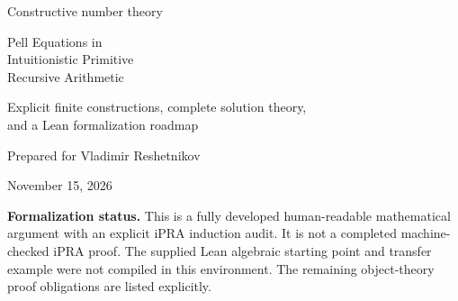 \documentclass[11pt,letterpaper]{article}
\theoremstyle{definition}
\newcommand{\isqrt}{\operatorname{isqrt}}
\begin{document}
\begin{titlepage}
\vspace*{1.1cm}
{\Large\color{blue!45!black} Constructive number theory\par}
\vspace{0.5cm}
{\huge\bfseries\raggedright Pell Equations in\\
Intuitionistic Primitive\\
Recursive Arithmetic\par}
\vspace{0.7cm}
{\Large\raggedright Explicit finite constructions, complete solution theory,\\
and a Lean formalization roadmap\par}
\vspace{1cm}
{\large Prepared for Vladimir Reshetnikov\par}
{\large November 15, 2026\par}
\vfill
\begin{abstract}
We develop the ordinary and generalized Pell equations using only intuitionistic
logic, primitive recursive functions, and quantifier-free induction. For every
nonsquare integer $D\ge2$, we construct its fundamental positive solution,
classify all solutions, decide the negative equation and every equation
$x^2-Dy^2=N$, and prove divisibility, congruence, and approximation theorems.
The existence argument is given twice: first by two explicitly finite
pigeonhole arguments, then by a reduced continued-fraction algorithm with at
most $4a(a+1)$ convergents, where $a=\isqrt(D)$. A finite proof of Legendre's
criterion establishes the familiar period-parity rule and minimality.
All searches, descents, and approximation moduli have stated bounds.
Radical notation denotes a decidable ordered field of rational pairs, not an
assumed real-number continuum. The accompanying code exercises the exact
arithmetic constructions. A detailed plan connects the proofs to the actual
embedded iPRA theory and native-calculus bridge in ProveIt.
\end{abstract}
\vspace{0.4cm}
\noindent\textbf{Formalization status.} This is a fully developed human-readable
mathematical argument with an explicit iPRA induction audit. It is not a
completed machine-checked iPRA proof. The supplied Lean algebraic starting
point and transfer example were not compiled in this environment. The
remaining object-theory proof obligations are listed explicitly.
\end{titlepage}
\end{document}
